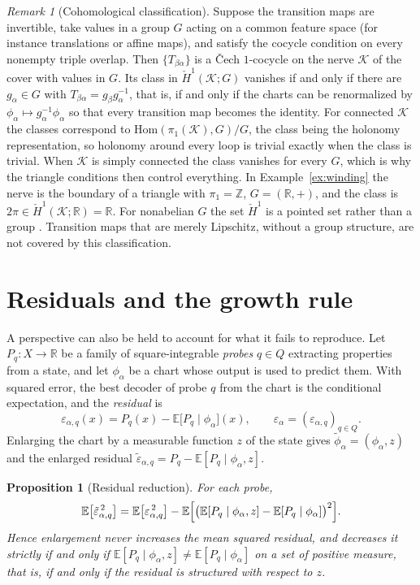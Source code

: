 \documentclass[11pt]{article}
\newtheorem{proposition}{Proposition}
\theoremstyle{remark}
\newtheorem{remark}{Remark}
\newcommand{\R}{\mathbb{R}}
\newcommand{\E}{\mathbb{E}}
\begin{document}
\begin{remark}[Cohomological classification]
Suppose the transition maps are invertible, take values in a group $G$ acting on a common feature space (for instance translations or affine maps), and satisfy the cocycle condition on every nonempty triple overlap. Then $\{T_{\beta\alpha}\}$ is a \v{C}ech $1$-cocycle on the nerve $\mathcal{K}$ of the cover with values in $G$. Its class in $\check H^1(\mathcal K;G)$ vanishes if and only if there are $g_\alpha\in G$ with $T_{\beta\alpha}=g_\beta g_\alpha^{-1}$, that is, if and only if the charts can be renormalized by $\phi_\alpha\mapsto g_\alpha^{-1}\phi_\alpha$ so that every transition map becomes the identity. For connected $\mathcal K$ the classes correspond to $\mathrm{Hom}(\pi_1(\mathcal K),G)/G$, the class being the holonomy representation, so holonomy around every loop is trivial exactly when the class is trivial. When $\mathcal K$ is simply connected the class vanishes for every $G$, which is why the triangle conditions then control everything. In Example~\ref{ex:winding} the nerve is the boundary of a triangle with $\pi_1=\mathbb Z$, $G=(\R,+)$, and the class is $2\pi\in\check H^1(\mathcal K;\R)=\R$. For nonabelian $G$ the set $\check H^1$ is a pointed set rather than a group \cite{bott}. Transition maps that are merely Lipschitz, without a group structure, are not covered by this classification.
\end{remark}

\section{Residuals and the growth rule}

A perspective can also be held to account for what it fails to reproduce. Let $P_q:X\to\R$ be a family of square-integrable \emph{probes} $q\in Q$ extracting properties from a state, and let $\phi_\alpha$ be a chart whose output is used to predict them. With squared error, the best decoder of probe $q$ from the chart is the conditional expectation, and the \emph{residual} is
\[
\varepsilon_{\alpha,q}(x)=P_q(x)-\E\bigl[P_q\mid\phi_\alpha\bigr](x),
\qquad
\varepsilon_\alpha=(\varepsilon_{\alpha,q})_{q\in Q}.
\]
Enlarging the chart by a measurable function $z$ of the state gives $\tilde\phi_\alpha=(\phi_\alpha,z)$ and the enlarged residual $\tilde\varepsilon_{\alpha,q}=P_q-\E[P_q\mid\phi_\alpha,z]$.

\begin{proposition}[Residual reduction]\label{prop:resid}
For each probe,
\[
\E\bigl[\tilde\varepsilon_{\alpha,q}^{\,2}\bigr]
=\E\bigl[\varepsilon_{\alpha,q}^{\,2}\bigr]
-\E\Bigl[\bigl(\E[P_q\mid\phi_\alpha,z]-\E[P_q\mid\phi_\alpha]\bigr)^2\Bigr].
\]
Hence enlargement never increases the mean squared residual, and decreases it strictly if and only if $\E[P_q\mid\phi_\alpha,z]\neq\E[P_q\mid\phi_\alpha]$ on a set of positive measure, that is, if and only if the residual is \emph{structured} with respect to $z$.
\end{proposition}
\end{document}
